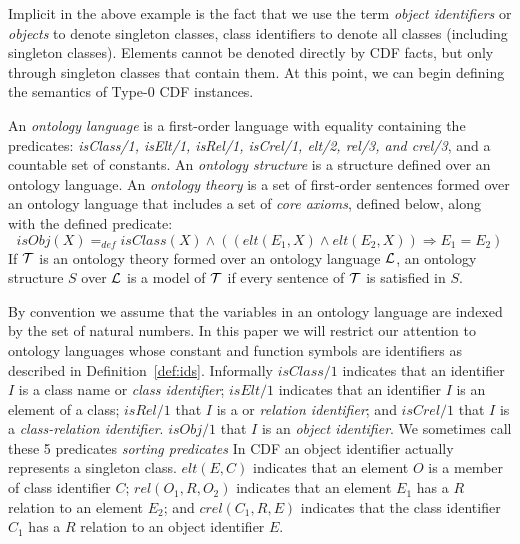Implicit in the above example is the fact that we use the term {\em
object identifiers} or {\em objects} to denote singleton classes,
class identifiers to denote all classes (including singleton classes).
Elements cannot be denoted directly by CDF facts, but only through
singleton classes that contain them.  At this point, we can begin
defining the semantics of Type-0 CDF instances.

\begin{definition} \label{def:ontolang}
  
%
An {\em ontology language} is a first-order language with equality
containing the predicates: {\em isClass/1, isElt/1, isRel/1, isCrel/1,
elt/2, rel/3, and crel/3}, and a countable set of constants.  An {\em
ontology structure} is a structure defined over an ontology language.
An {\em ontology theory} is a set of first-order sentences formed over
an ontology language that includes a set of {\em core axioms}, defined
below, along with the defined predicate:
\[
isObj(X) =_{def} isClass(X) \wedge 
	((elt(E_1,X) \wedge elt(E_2,X)) \Rightarrow E_1 = E_2)
\]
If ${\cal T}$ is an ontology theory formed over an ontology
language ${\cal L}$, an ontology structure $S$ over ${\cal L}$ is a model of
${\cal T}$ if every sentence of ${\cal T}$ is satisfied in $S$.
\end{definition}

By convention we assume that the variables in an ontology language are
indexed by the set of natural numbers.  In this paper we will restrict
our attention to ontology languages whose constant and function
symbols are identifiers as described in Definition~\ref{def:ids}.
Informally $isClass/1$ indicates that an identifier $I$ is a class
name or {\em class identifier}; $isElt/1$ indicates that an identifier
$I$ is an element of a class; $isRel/1$ that $I$ is a or {\em relation
identifier}; and $isCrel/1$ that $I$ is a {\em class-relation
identifier}.  $isObj/1$ that $I$ is an {\em object identifier}.  We
sometimes call these 5 predicates {\em sorting predicates} In CDF an
object identifier actually represents a singleton class.  $elt(E,C)$
indicates that an element $O$ is a member of class identifier $C$;
$rel(O_1,R,O_2)$ indicates that an element $E_1$ has a $R$ relation to
an element $E_2$; and $crel(C_1,R,E)$ indicates that the class
identifier $C_1$ has a $R$ relation to an object identifier $E$.

